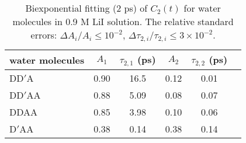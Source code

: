 \begin{table}[H]
\centering
\caption{\label{tab:fitting_c2_for_each_type_of_water}%
	Biexponential fitting (2 ps) of $C_2(t)$ for water molecules in 0.9 M LiI solution. 
The relative standard errors: $\Delta A_i/A_i \le 10^{-2}$, $\Delta \tau_{2,i}/\tau_{2,i} \le 3\times 10^{-2}$.}
\begin{tabular}{lccccc}
water molecules & $A_1$  & $\tau_{2,1}$ (ps) & $A_2$ & $\tau_{2,2}$ (ps) \\
\hline
DD$'$A & 0.90 & 16.5 & 0.12 & 0.01 \\
DD$'$AA & 0.88 & 5.09 & 0.08 & 0.07 \\
DDAA & 0.85 & 3.98 & 0.10 & 0.06 \\
D$'$AA & 0.38 & 0.14 & 0.38 & 0.14 \\
\end{tabular}
\end{table}
%

